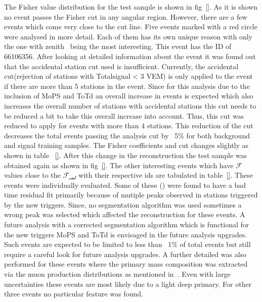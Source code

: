 The Fisher value distribution for the test sample is shown in fig~\ref{}. As it is shown no event passes the Fisher cut in any angular region. However, there are a few events which come very close to the cut line. Five events marked with a red circle were analysed in more detail. Each of them has its own unique reason with only the one with zenith~ being the most interesting. This event has the ID of 66106356. After looking at detailed information about the event it was found out that the accidental station cut used is insufficient. Currently, the  accidental cut(rejection of stations with Totalsignal < 3  VEM) is only applied to the event if there are more than 5 stations in the event. Since for this analysis due to the inclusion of MoPS and ToTd an overall increase in events is expected which also increases the overall number of stations with accidental stations this cut needs to be reduced a bit to take this overall increase into account. Thus, this cut was reduced to apply for events with more than 4 stations. This reduction of the cut decreases the total events passing the analysis cut by ~5\% for both background and signal training samples. The Fisher coefficients and cut changes slightly as shown in table ~\ref{}. After this change in the reconstruction the test sample was obtained again as shown in fig~\ref{}. The other interesting events which have $\mathcal{F}$ values close to the $\mathcal{F_{cut}}$ with their respective ids are tabulated in table~\ref{}. These events were individually evaluated. Some of these () were found to have a bad time residual fit primarily because of mutiple peaks observed in stations triggered by the new triggers. Since, no segmentation algorithm was used sometimes a wrong peak was selected which affected the reconstruction for these events. A future analysis with a corrected segmentation algorithm which is functional for the new triggers MoPS and ToTd is envisaged in the future analysis upgrades. Such events are expected to be limited to less than ~1\% of total events but still require a careful look for future analysis upgrades. A further detailed was also performed for these events where the primary mass composition was extracted via the muon production distributions as mentioned in~\cite{}. Even with large uncertainties these events are most likely due to a light deep primary. For other three events no particular feature was found. 

